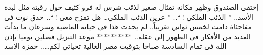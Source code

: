 إختفى الصندوق وظهر مكانه تمثال صغير لذئب شرس له فرو كثيف حول رقبته مثل لبدة الأسد..
” الذئب الملكي ! “..
” عرين الذئب الملكي… هل تمزح معى ! “..
حدق نوت فى مفاجئاة دامت لخمس ثواني تقريباً..
لم يحدث هذا فى حياته الماضية وسرعان ما بدأت العديد من الأفكار فى الظهور إلى عقله..
**********
موعد التنزيل فصلين يوميا بإذن الله فى تمام السادسة صباحا بتوقيت مصر الغالية
تحياتي لكم….. حمزة الاسد






























































